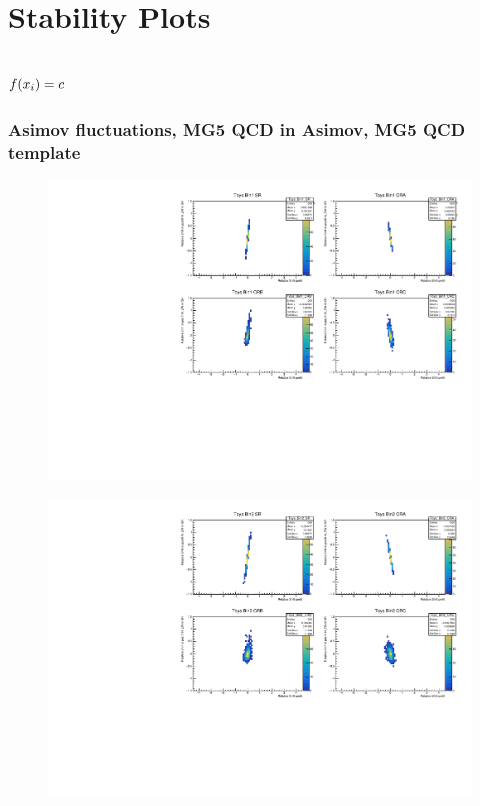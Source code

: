 \section{Stability Plots \label{sec:appendix:stability}}

\subsection{$f(x_i)=c$\label{sec:appendix:stability:fxc}}
\subsubsection{\mjj Asimov fluctuations, MG5 QCD in Asimov, MG5 QCD template}
\begin{figure}[H]
\includegraphics[width=\textwidth]{plots/diffx/instab/constfx/instabilities_mjj_QCD_Mgraph_Signal_Sh2211_BSDATASTATS_madgraphasimov_bin1.pdf}
\end{figure}
\begin{figure}[H]
\includegraphics[width=\textwidth]{plots/diffx/instab/constfx/instabilities_mjj_QCD_Mgraph_Signal_Sh2211_BSDATASTATS_madgraphasimov_bin2.pdf}
\end{figure}
